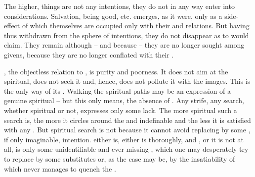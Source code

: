 The higher,  things are not any intentions, they do not in any way
enter into  considerations. Salvation, being good, etc. emerges, as it
were, only as a side-effect of  which themselves are occupied only with
their   and  relations. But having thus
withdrawn from the sphere of  intentions, they do not disappear as
 to  would claim. They remain 
although -- and because -- they are no longer sought among  givens,
because they are no longer conflated with their . 



\pa\label{pa:forget} , the objectless relation to ,
is purity and poorness. It does not aim at the spiritual, does not seek it and,
hence, does not pollute it with the  images.  This is the only way
of its .   Walking the spiritual paths may be an
expression of a genuine spiritual  -- but this only means, the
absence of .   Any strife, any search, whether spiritual or
not, expresses only some lack. The more spiritual such a search is, the more it circles
around the  and indefinable  and the less it is satisfied
with any .  But spiritual search is not  because it cannot
avoid replacing  by some , if only 
imaginable, intention.   either is, either is thoroughly,
 and , or it is not at all, is only some
unidentifiable and ever missing , which one may desperately try to
replace by some  substitutes or, as the case may be, by the
insatiability of  which never manages to quench the .

